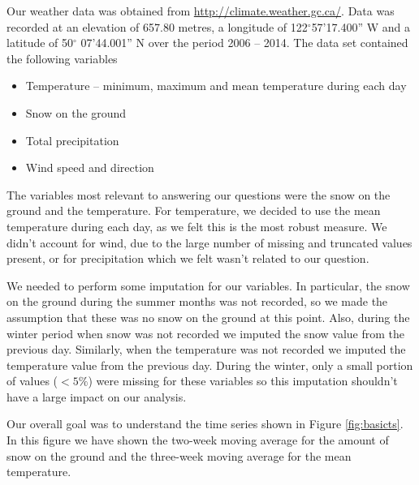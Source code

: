 \documentclass[12pt,twoside]{article}
\begin{document}
{Our weather data was obtained from \url{http://climate.weather.gc.ca/}. Data was recorded at an elevation of 657.80 metres, a longitude of 122$^{\circ}$57'17.400'' W and a latitude of 50$^{\circ}$ 07'44.001'' N over the period 2006 -- 2014. The data set contained the following variables

\begin{itemize}
\item Temperature -- minimum, maximum and mean temperature during each day
\item Snow on the ground 
\item Total precipitation 
\item Wind speed and direction
\end{itemize}

\vspace{-3mm}
\medskip The variables most relevant to answering our questions were the snow on the ground and the temperature. For temperature, we decided to use the mean temperature during each day, as we felt this is the most robust measure. We didn't account for wind, due to the large number of missing and truncated values present, or for precipitation which we felt wasn't related to our question. 

We needed to perform some imputation for our variables. In particular, the snow on the ground during the summer months was not recorded, so we made the assumption that these was no snow on the ground at this point. Also, during the winter period when snow was not recorded we imputed the snow value from the previous day. Similarly, when the temperature was not recorded we imputed the temperature value from the previous day. During the winter, only a small portion of values ($<5\%$) were missing for these variables so this imputation shouldn't have a large impact on our analysis.

Our overall goal was to understand the time series shown in Figure \ref{fig:basicts}. In this figure we have shown the two-week moving average for the amount of snow on the ground and the three-week moving average for the mean temperature.


}
\end{document}
